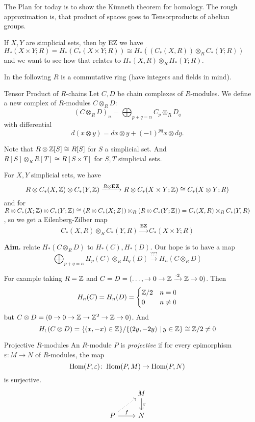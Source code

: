 \documentclass[language=english]{TemplateLecture}
\begin{document}


The Plan for today is to show the Künneth theorem for homology. The rough approximation is, that product of spaces goes to Tensorproducts of abelian groups.

If \(X,Y\) are simplicial sets, then by EZ we have \(H_*(X\times Y; R) = H_*(C_*(X\times Y; R)) \cong H_*((C_*(X,R)) \otimes_R C_*(Y; R))\) and we want to see how that relates to \(H_*(X,R) \otimes_R H_*(Y; R)\).

In the following \(R\) is a commutative ring (have integers and fields in mind).

\begin{defi}{Tensor Product of \(R\)-chains}{}
Let \(C,D\) be chain complexes of \(R\)-modules. We define a new complex of \(R\)-modules \(C \otimes_R D\):
\[(C\otimes_R D)_n = \bigoplus_{p+q = n} C_p \otimes_R D_q\]
with differential
\[d(x\otimes y) = dx \otimes y + (-1)^{pq} x\otimes dy.\]
\end{defi}

Note that \(R \otimes \mathbb{Z}[S] \cong R[S]\) for \(S\) a simplicial set. And \(R[S] \otimes_R R [T] \cong R[S\times T]\) for \(S,T\) simplicial sets.

For \(X,Y\) simplicial sets, we have
\[R\otimes C_*(X,\mathbb{Z}) \otimes C_*(Y,\mathbb{Z}) \xrightarrow{R\otimes \mathbf{EZ}} R\otimes C_*(X\times Y; \mathbb{Z}) \cong C_*(X\otimes Y; R)\]
and for \(R\otimes C_*(X; \mathbb{Z}) \otimes C_*(Y; \mathbb{Z}) \cong (R\otimes C_*(X;Z)) \otimes_R (R \otimes C_*(Y; \mathbb{Z})) = C_*(X,R) \otimes_R C_*(Y,R)\), so we get a Eilenberg-Zilber map
\[C_*(X,R)\otimes_R C_*(Y,R) \xrightarrow{\mathbf{EZ}} C_*(X\times Y; R)\]

\textbf{Aim.} relate \(H_*(C\otimes_R D)\) to \(H_*(C), H_*(D)\). Our hope is to have a map
\[\bigoplus_{p+q = n} H_p(C) \otimes_R H_q(D) \xrightarrow{???} H_n(C\otimes_R D)\]

For example taking \(R = \mathbb{Z}\) and \(C = D = (\dots ,\rightarrow 0\rightarrow \mathbb{Z} \xrightarrow{\cdot 2}\mathbb{Z} \rightarrow 0)\). Then
\[H_n(C) = H_n(D) = \begin{cases}
    \mathbb{Z}/2 & n = 0 \\
    0 & n \neq 0 \\
\end{cases}\]
but \(C \otimes D = (0\rightarrow 0 \rightarrow \mathbb{Z} \rightarrow \mathbb{Z}^2 \rightarrow \mathbb{Z} \rightarrow 0)\). And 
\[H_1(C\otimes D) = \{(x,-x) \in \mathbb{Z}\}/\{(2y, -2y) \mid y\in \mathbb{Z}\} \cong \mathbb{Z}/2 \neq 0\]

\begin{defi}{Projective \(R\)-modules}{}
    An \(R\)-module \(P\) is \emph{projective} if for every epimorphism \(\varepsilon \colon M\to N\) of \(R\)-modules, the map
    \[\operatorname{Hom}(P, \varepsilon) \colon \operatorname{Hom}(P, M) \to \operatorname{Hom}(P, N)\]
    is surjective.
    \[\begin{tikzcd}
        & M \ar[d, "\varepsilon", two heads] \\
        P \ar[ru, dotted] \ar[r, "f"] & N \\
    \end{tikzcd}\]
\end{defi}
\end{document}
